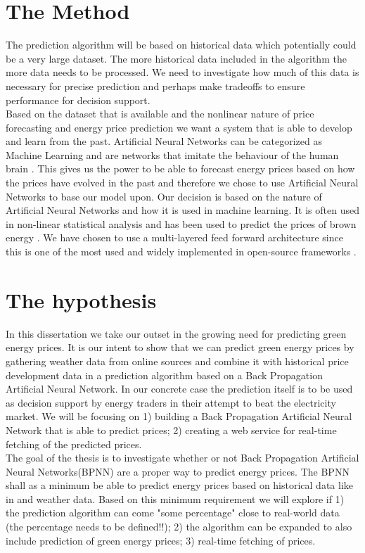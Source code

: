 \documentclass[twoside,11pt,openright]{report}
\begin{document}
\section{The Method}
The prediction algorithm will be based on historical data which potentially could be a very large dataset. The more historical data included in the algorithm the more data needs to be processed. We need to investigate how much of this data is necessary for precise prediction and perhaps make tradeoffs to ensure performance for decision support.
\\[0.5cm] 
Based on the dataset that is available and the nonlinear nature of price forecasting and energy price prediction we want a system that is able to develop and learn from the past. Artificial Neural Networks can be categorized as Machine Learning \cite{18} and are networks that imitate the behaviour of the human brain \cite{1}. This gives us the power to be able to forecast energy prices based on how the prices have evolved in the past and therefore we chose to use Artificial Neural Networks to base our model upon. Our decision is based on the nature of Artificial Neural Networks and how it is used in machine learning. It is often used in non-linear statistical analysis \cite{16} and has been used to predict the prices of brown energy \cite{2}\cite{3}. We have chosen to use a multi-layered feed forward architecture since this is one of the most used and widely implemented in open-source frameworks \cite{17}.

\section{The hypothesis}
In this dissertation we take our outset in the growing need for predicting green energy prices. It is our intent to show that we can predict green energy prices by gathering weather data from online sources and combine it with historical price development data in a prediction algorithm based on a Back Propagation Artificial Neural Network. In our concrete case the prediction itself is to be used as decision support by energy traders in their attempt to beat the electricity market. We will be focusing on 1) building a Back Propagation Artificial Neural Network that is able to predict prices; 2) creating a web service for real-time fetching of the predicted prices. 
\\[0.5cm] 
The goal of the thesis is to investigate whether or not Back Propagation Artificial Neural Networks(BPNN) are a proper way to predict energy prices. The BPNN shall as a minimum be able to predict energy prices based on historical data like in \cite{2} and weather data. Based on this minimum requirement we will explore if 1) the prediction algorithm can come "some percentage" close to real-world data (the percentage needs to be defined!!); 2) the algorithm can be expanded to also include prediction of green energy prices; 3) real-time fetching of prices.
\end{document}
